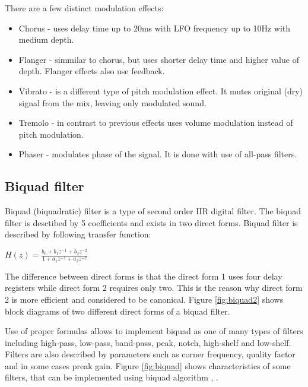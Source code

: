 \documentclass[a4paper,twoside,12pt]{book}
\begin{document}
There are a few distinct modulation effects:
\begin{itemize}
    \item Chorus - uses delay time up to 20ms with LFO frequency up to 10Hz with medium depth.
    \item Flanger - simmilar to chorus, but uses shorter delay time and higher value of depth.
        Flanger effects also use feedback.
    \item Vibrato - is a different type of pitch modulation effect. It mutes original (dry) signal
        from the mix, leaving only modulated sound.
    \item Tremolo - in contrast to previous effects uses volume modulation instead of pitch modulation.
    \item Phaser - modulates phase of the signal. It is done with use of all-pass filters.
\end{itemize}

\subsection{Biquad filter}
Biquad (biquadratic) filter is a type of second order IIR digital filter.
The biquad filter is desctibed by 5 coefficients and exists in two direct forms.
Biquad filter is described by following transfer function:

\(H(z) = \frac{b_0 + b_1z^{-1} + b_2z^{-2}}{1 + a_1z^{-1} + a_2z^{-2}}\)

The difference between direct forms is that the direct form 1 uses four delay registers
while direct form 2 requires only two.
This is the reason why direct form 2 is more efficient and considered to be canonical.
Figure \ref{fig:biquad2} shows block diagrams of two different
direct forms of a biquad filter.

Use of proper formulas allows to implement biquad as one of many types of filters
including high-pass, low-pass, band-pass, peak, notch, high-shelf and low-shelf.
Filters are also described by parameters such as corner frequency, quality factor
and in some cases preak gain.
Figure \ref{fig:biquad} shows characteristics of some filters,
that can be implemented using biquad algorithm
\cite{Biquad},
\cite{biquad_web}.
\end{document}
